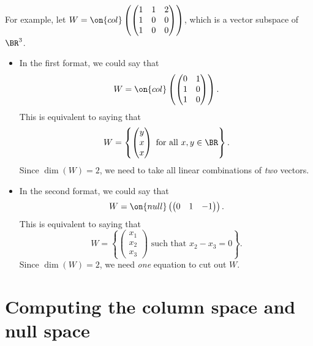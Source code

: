 \documentclass[10pt]{amsart}
\theoremstyle{mythm}
\theoremstyle{definition}
\theoremstyle{myrmk}
\begin{document}
	For example, let $W = \on{col}\left( \begin{pmatrix}
	1 & 1 & 2 \\  1& 0 & 0 \\ 1 & 0 & 0 
	\end{pmatrix}\right)$, which is a vector subspace of $\BR^3$. 
	\begin{itemize}
		\item In the first format, we could say that 
		\[
		W = \on{col}\left( \begin{pmatrix}
		0 & 1 \\ 1 & 0 \\ 1 & 0 
		\end{pmatrix}\right). 
		\]
		This is equivalent to saying that 
		\[
		W = \left\{ \begin{pmatrix}
		y \\ x \\ x 
		\end{pmatrix} \text{ for all } x, y \in \BR \right\}. 
		\]
		Since $\dim(W) = 2$, we need to take all linear combinations of \emph{two} vectors. 
		\item In the second format, we could say that 
		\[
		W = \on{null}\left( \begin{pmatrix}
		0 & 1 & -1
		\end{pmatrix}\right). 
		\]
		This is equivalent to saying that 
		\[
		W = \left\{ \begin{pmatrix}
		x_1 \\ x_2 \\ x_3
		\end{pmatrix} \text{ such that } x_2 - x_3 = 0 \right\}. 
		\]
		Since $\dim(W) = 2$, we need \emph{one} equation to cut out $W$. 
	\end{itemize}
	
	\section{Computing the column space and null space}
	
\end{document}
